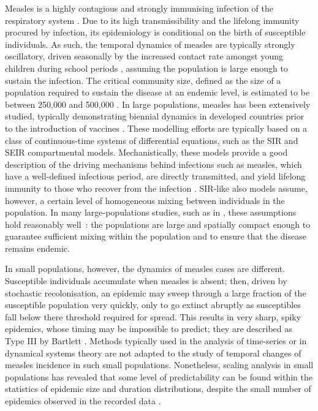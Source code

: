 \documentclass[10pt]{article}
\begin{document}
Measles is a highly contagious and strongly immunising infection of the respiratory system \cite{Anderson1991}. Due to its high transmissibility and the lifelong immunity procured by infection, its epidemiology is conditional on the birth of susceptible individuals. As such, the temporal dynamics of measles are typically strongly oscillatory, driven seasonally by the increased contact rate amongst young children during school periods \cite{London1973, Fine1982, Schenzle1984}, assuming the population is large enough to sustain the infection. The critical community size, defined as the size of a population required to sustain the disease at an endemic level, is estimated to be between 250,000 and 500,000 \cite{Bartlett1957, Black1966, Keeling1997}. In large populations, measles has been extensively studied, typically demonstrating biennial dynamics in developed countries prior to the introduction of vaccines \cite{Bolker1995, Grenfell1997}. These modelling efforts are typically based on a class of continuous-time systems of differential equations, such as the SIR and SEIR compartmental models. Mechanistically, these models provide a good description of the driving mechanisms behind infections such as measles, which have a well-defined infectious period, are directly transmitted, and yield lifelong immunity to those who recover from the infection \cite{Anderson1991}. SIR-like also models assume, however, a certain level of homogeneous mixing between individuals in the population. In many large-populations studies, such as in \cite{Bjornstad2002}, these assumptions hold reasonably well~: the populations are large and spatially compact enough to guarantee sufficient mixing within the population and to ensure that the disease remains endemic. 

In small populations, however, the dynamics of measles cases are different. Susceptible individuals accumulate when measles is absent; then, driven by stochastic recolonisation, an epidemic may sweep through a large fraction of the susceptible population very quickly, only to go extinct abruptly as susceptibles fall below there threshold required for spread. This results in very sharp, spiky epidemics, whose timing may be impossible to predict; they are described as Type III by Bartlett \cite{Bartlett1957}. Methods typically used in the analysis of time-series or in dynamical systems theory are not adapted to the study of temporal changes of measles incidence in such small populations. Nonetheless, scaling analysis in small populations has revealed that some level of predictability can be found within the statistics of epidemic size and duration distributions, despite the small number of epidemics observed in the recorded data \cite{Rhodes1996a, Rhodes1996b}.
\end{document}
